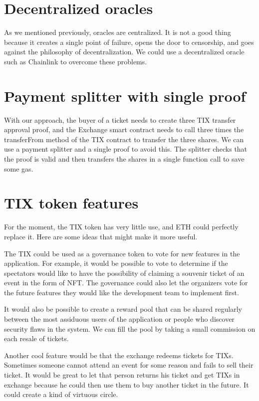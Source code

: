 \documentclass[a4paper,11pt,oneside]{report}
\begin{document}
\section{Decentralized oracles}
As we mentioned previously, oracles are centralized. It is not a good thing because it creates a single point of failure, opens the door to censorship, and goes against the philosophy of decentralization. We could use a decentralized oracle such as Chainlink to overcome these problems.

\section{Payment splitter with single proof}
With our approach, the buyer of a ticket needs to create three TIX transfer approval proof, and the Exchange smart contract needs to call three times the transferFrom method of the TIX contract to transfer the three shares. We can use a payment splitter and a single proof to avoid this. The splitter checks that the proof is valid and then transfers the shares in a single function call to save some gas. 

\section{TIX token features}
For the moment, the TIX token has very little use, and ETH could perfectly replace it. Here are some ideas that might make it more useful.

The TIX could be used as a governance token to vote for new features in the application. For example, it would be possible to vote to determine if the spectators would like to have the possibility of claiming a souvenir ticket of an event in the form of NFT. The governance could also let the organizers vote for the future features they would like the development team to implement first.

It would also be possible to create a reward pool that can be shared regularly between the most assiduous users of the application or people who discover security flaws in the system. We can fill the pool by taking a small commission on each resale of tickets.

Another cool feature would be that the exchange redeems tickets for TIXs. Sometimes someone cannot attend an event for some reason and fails to sell their ticket. It would be great to let that person returns his ticket and get TIXs in exchange because he could then use them to buy another ticket in the future. It could create a kind of virtuous circle.
\end{document}
